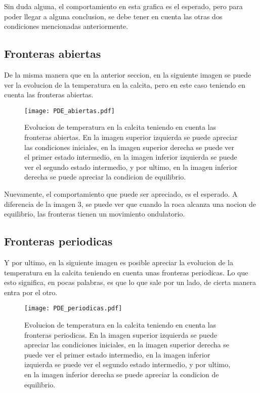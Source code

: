\documentclass[11pt]{article}
\begin{document}
		Sin duda alguna, el comportamiento en esta grafica es el esperado, pero para poder llegar a alguna conclusion, se debe tener en cuenta las otras dos condiciones mencionadas 			anteriormente. 

	\subsection{Fronteras abiertas}

		De la misma manera que en la anterior seccion, en la siguiente imagen se puede ver la evolucion de la temperatura en la calcita, pero en este caso teniendo en cuenta las fronteras 			abiertas.
		\begin{figure}[H]
    			\centering
    				\texttt{[image: PDE\_abiertas.pdf]}
    				\caption{Evolucion de temperatura en la calcita teniendo en cuenta las fronteras abiertas. En la imagen superior izquierda se puede apreciar las condiciones iniciales, 					en la imagen superior derecha se puede ver el primer estado intermedio, en la imagen inferior izquierda se puede ver el segundo estado intermedio, y por ultimo, 						en la imagen inferior derecha se puede apreciar la condicion de equilibrio.}
    			\label{fig:abiertas}
		\end{figure}

		Nuevamente, el comportamiento que puede ser apreciado, es el esperado. A diferencia de la imagen 3, se puede ver que cuando la roca alcanza una nocion de equilibrio, las 			fronteras tienen un movimiento ondulatorio. 
	\subsection{Fronteras periodicas}

		Y por ultimo, en la siguiente imagen es posible apreciar la evolucion de la temperatura en la calcita teniendo en cuenta unas fronteras periodicas. Lo que esto significa, en pocas 			palabras, es que lo que sale por un lado, de cierta manera entra por el otro. 
		\begin{figure}[H]
    			\centering
    				\texttt{[image: PDE\_periodicas.pdf]}
    				\caption{Evolucion de temperatura en la calcita teniendo en cuenta las fronteras periodicas. En la imagen superior izquierda se puede apreciar las condiciones 						iniciales, en la imagen superior derecha se puede ver el primer estado intermedio, en la imagen inferior izquierda se puede ver el segundo estado intermedio, y 					por ultimo, en la imagen inferior derecha se puede apreciar la condicion de equilibrio.}
    			\label{fig:periodicas}
		\end{figure}
\end{document}
